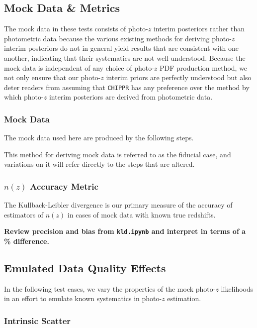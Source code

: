 \documentclass[iop]{emulateapj}
\newcommand{\chippr}{\texttt{CHIPPR} }
\begin{document}
\subsection{Mock Data \& Metrics}
\label{sec:validintro}

The mock data in these tests consists of photo-$z$ interim posteriors rather than photometric data because the various existing methods for deriving photo-$z$ interim posteriors do not in general yield results that are consistent with one another, indicating that their systematics are not well-understood.  Because the mock data is independent of any choice of photo-$z$ PDF production method, we not only ensure that our photo-$z$ interim priors are perfectly understood but also deter readers from assuming that \chippr has any preference over the method by which photo-$z$ interim posteriors are derived from photometric data.

\subsubsection{Mock Data}
\label{sec:mockdata}

The mock data used here are produced by the following steps.  

This method for deriving mock data is referred to as the fiducial case, and variations on it will refer directly to the steps that are altered.

\subsubsection{$n(z)$ Accuracy Metric}
\label{sec:accuracy}

The Kullback-Leibler divergence is our primary measure of the accuracy of estimators of $n(z)$ in cases of mock data with known true redshifts.

\textbf{Review precision and bias from \texttt{kld.ipynb} and interpret in terms of a \% difference.}

\subsection{Emulated Data Quality Effects}
\label{sec:likelihoods}

In the following test cases, we vary the properties of the mock photo-$z$ likelihoods in an effort to emulate known systematics in photo-$z$ estimation.

\subsubsection{Intrinsic Scatter}
\label{sec:intscat}
\end{document}
